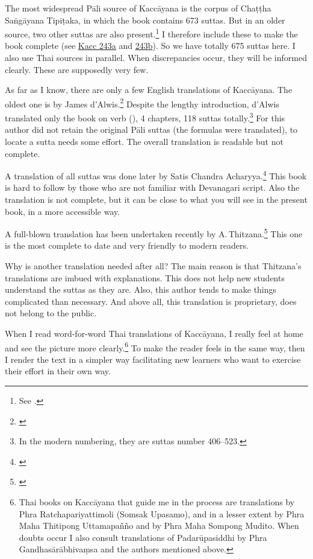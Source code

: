 The most widespread Pāli source of Kaccāyana is the corpus of Chaṭṭha Saṅgāyana Tipiṭaka, in which the book contains 673 suttas. But in an older source, two other suttas are also present.\footnote{See \citealp[p.~221]{thitzana:kacc1}.} I therefore include these to make the book complete (see \hyperref[sut:243a]{Kacc 243a} and \hyperref[sut:243b]{243b}). So we have totally 675 suttas here. I also use Thai sources in parallel. When discrepancies occur, they will be informed clearly. These are supposedly very few.

As far as I know, there are only a few English translations of Kaccāyana. The oldest one is by James d'Alwis.\footnote{\citealp{dalwis:kach}} Despite the lengthy introduction, d'Alwis translated only the book on verb (), 4 chapters, 118 suttas totally.\footnote{In the modern numbering, they are suttas number 406--523.} For this author did not retain the original Pāli suttas (the formulas were translated), to locate a sutta needs some effort. The overall translation is readable but not complete.

A translation of all suttas was done later by Satis Chandra Acharyya.\footnote{\citealp{satis:kacc}} This book is hard to follow by those who are not familiar with Devanagari script. Also the translation is not complete, but it can be close to what you will see in the present book, in a more accessible way.

A full-blown translation has been undertaken recently by A.\,Thitzana.\footnote{\citealp{thitzana:kacc2}} This one is the most complete to date and very friendly to modern readers.

Why is another translation needed after all? The main reason is that Thitzana's translations are imbued with explanations. This does not help new students understand the suttas as they are. Also, this author tends to make things complicated than necessary. And above all, this translation is proprietary, does not belong to the public.

When I read word-for-word Thai translations of Kaccāyana, I really feel at home and see the picture more clearly.\footnote{Thai books on Kaccāyana that guide me in the process are translations by Phra Ratchapariyattimoli (Somsak Upasamo), and in a lesser extent by Phra Maha Thitipong Uttamapañño and by Phra Maha Sompong Mudito. When doubts occur I also consult translations of Padarūpasiddhi by Phra Gan\-dhasārābhivaṃsa and the authors mentioned above.} To make the reader feels in the same way, then I render the text in a simpler way facilitating new learners who want to exercise their effort in their own way.

